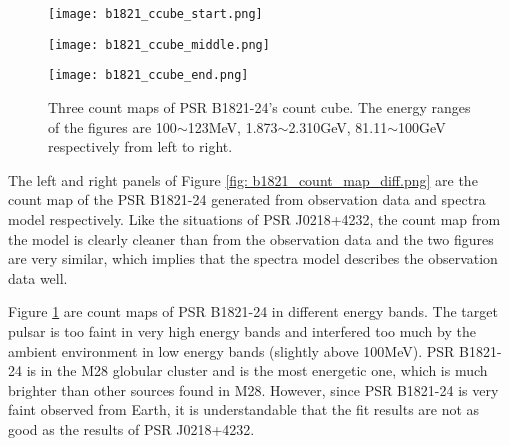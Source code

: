 \documentclass[12pt]{report}
\newcommand{\mycaption}[1]{\protect \caption{#1}}
\begin{document}
      \begin{figure}[!ht]
        \begin{center}
          \begin{minipage}{0.31\textwidth}
            \begin{center} 
              \texttt{[image: b1821\_ccube\_start.png]}
            \end{center}
          \end{minipage}
          \begin{minipage}{0.31\textwidth}
            \begin{center}
              \texttt{[image: b1821\_ccube\_middle.png]}
            \end{center}
          \end{minipage}
          \begin{minipage}{0.31\textwidth}
            \begin{center}
            \texttt{[image: b1821\_ccube\_end.png]}
            \end{center}
          \end{minipage}
          \end{center}
          \mycaption{Three count maps of PSR B1821-24's count cube. The energy ranges of the 
            figures are 100$\sim$123MeV, 1.873$\sim$2.310GeV, 81.11$\sim$100GeV respectively from 
            left to right.}
          \label{fig: b1821_ccube_1_15_33.png}
      \end{figure}

      The left and right panels of Figure \ref{fig: b1821_count_map_diff.png} are the count 
      map of the PSR B1821-24 generated from observation data and spectra model respectively. 
      Like the situations of PSR J0218+4232, the count map from the model is clearly cleaner than 
      from the observation data and the two figures are very similar, which implies that 
      the spectra model describes the observation data well.  

      Figure \ref{fig: b1821_ccube_1_15_33.png} are count maps of PSR B1821-24 in 
      different energy bands. The target pulsar is too faint in very high energy bands 
      and interfered too much by the ambient environment in low energy bands 
      (slightly above 100MeV). PSR B1821-24 is in the M28 globular cluster and is the most 
      energetic one, which is much brighter than other sources found in M28. However, since 
      PSR B1821-24 is very faint observed from Earth, it is understandable that the fit 
      results are not as good as the results of PSR J0218+4232. 
\end{document}
